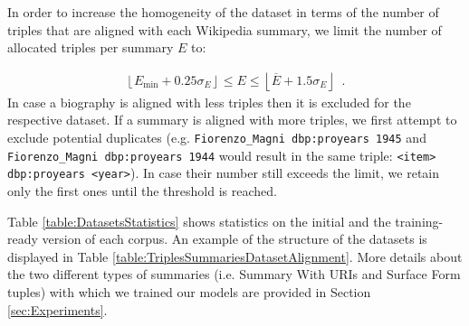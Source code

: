 \documentclass[preprint,5p]{elsarticle}
\begin{document}
In order to increase the homogeneity of the dataset in terms of the number of triples that are aligned with each Wikipedia summary, we limit the number of allocated triples per summary $E$ to:

\begin{align}
  \left \lfloor{E_{\min} + 0.25 \sigma_{E}}\right \rfloor \leq E \leq \left \lfloor{\overline{E} + 1.5 \sigma_{E}}\right \rfloor\enspace.
\end{align}In case a biography is aligned with less triples then it is excluded for the respective dataset. If a summary is aligned with more triples, we first attempt to exclude potential duplicates (e.g. \texttt{Fiorenzo\_Magni dbp:proyears 1945} and \texttt{Fiorenzo\_Magni dbp:proyears 1944} would result in the same triple: \texttt{<item> dbp:proyears <year>}). In case their number still exceeds the limit, we retain only the first ones until the threshold is reached.


Table \ref{table:DatasetsStatistics} shows statistics on the initial and the training-ready version of each corpus. An example of the structure of the datasets is displayed in Table \ref{table:TriplesSummariesDatasetAlignment}. More details about the two different types of summaries (i.e. Summary With URIs and Surface Form tuples) with which we trained our models are provided in Section \ref{sec:Experiments}. 
\end{document}
